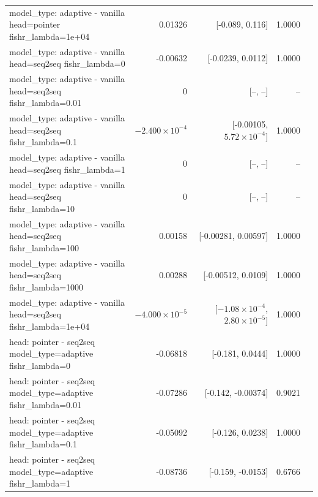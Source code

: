 \documentclass[10pt]{article}
\makeatletter
\newcommand{\stackcell}[1]{\begin{tabular}[t]{@{}l@{}}#1\end{tabular}}
\makeatother
\begin{document}
{\begin{longtable}{lrrrl}
\stackcell{model\_type: adaptive - vanilla\\\footnotesize head=pointer fishr\_lambda=1e+04 } & 0.01326 & [-0.089, 0.116] & 1.0000 & \\
\stackcell{model\_type: adaptive - vanilla\\\footnotesize head=seq2seq fishr\_lambda=0 } & -0.00632 & [-0.0239, 0.0112] & 1.0000 & \\
\stackcell{model\_type: adaptive - vanilla\\\footnotesize head=seq2seq fishr\_lambda=0.01 } & 0 & [--, --] & -- & \\
\stackcell{model\_type: adaptive - vanilla\\\footnotesize head=seq2seq fishr\_lambda=0.1 } & $-2.400\times10^{-4}$ & [-0.00105, $5.72\times10^{-4}$] & 1.0000 & \\
\stackcell{model\_type: adaptive - vanilla\\\footnotesize head=seq2seq fishr\_lambda=1 } & 0 & [--, --] & -- & \\
\stackcell{model\_type: adaptive - vanilla\\\footnotesize head=seq2seq fishr\_lambda=10 } & 0 & [--, --] & -- & \\
\stackcell{model\_type: adaptive - vanilla\\\footnotesize head=seq2seq fishr\_lambda=100 } & 0.00158 & [-0.00281, 0.00597] & 1.0000 & \\
\stackcell{model\_type: adaptive - vanilla\\\footnotesize head=seq2seq fishr\_lambda=1000 } & 0.00288 & [-0.00512, 0.0109] & 1.0000 & \\
\stackcell{model\_type: adaptive - vanilla\\\footnotesize head=seq2seq fishr\_lambda=1e+04 } & $-4.000\times10^{-5}$ & [$-1.08\times10^{-4}$, $2.80\times10^{-5}$] & 1.0000 & \\
\stackcell{head: pointer - seq2seq\\\footnotesize model\_type=adaptive fishr\_lambda=0 } & -0.06818 & [-0.181, 0.0444] & 1.0000 & \\
\stackcell{head: pointer - seq2seq\\\footnotesize model\_type=adaptive fishr\_lambda=0.01 } & -0.07286 & [-0.142, -0.00374] & 0.9021 & \\
\stackcell{head: pointer - seq2seq\\\footnotesize model\_type=adaptive fishr\_lambda=0.1 } & -0.05092 & [-0.126, 0.0238] & 1.0000 & \\
\stackcell{head: pointer - seq2seq\\\footnotesize model\_type=adaptive fishr\_lambda=1 } & -0.08736 & [-0.159, -0.0153] & 0.6766 & \\

\end{longtable}}
\end{document}
